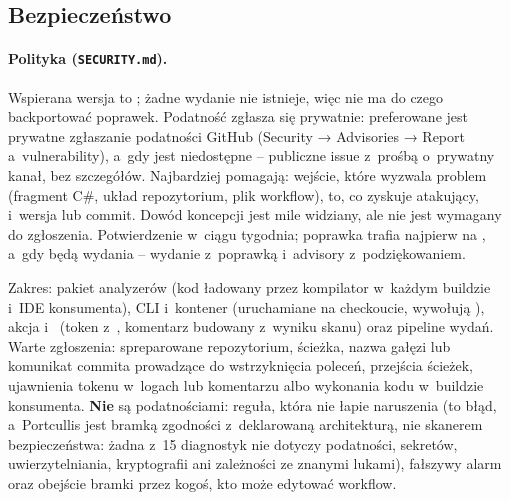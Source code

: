 
\subsection{Bezpieczeństwo}\label{sec:portcullis-bezpieczenstwo}

\paragraph{Polityka (\texttt{SECURITY.md}).} Wspierana wersja to ; żadne
wydanie nie istnieje, więc nie ma do czego backportować poprawek. Podatność zgłasza się
prywatnie: preferowane jest prywatne zgłaszanie podatności GitHub (Security → Advisories →
Report a~vulnerability), a~gdy jest niedostępne -- publiczne issue z~prośbą o~prywatny kanał,
bez szczegółów. Najbardziej pomagają: wejście, które wyzwala problem (fragment C\#, układ
repozytorium, plik workflow), to, co zyskuje atakujący, i~wersja lub commit. Dowód koncepcji
jest mile widziany, ale nie jest wymagany do zgłoszenia. Potwierdzenie
w~ciągu tygodnia; poprawka trafia najpierw na , a~gdy będą wydania -- wydanie
z~poprawką i~advisory z~podziękowaniem.

Zakres: pakiet analyzerów (kod ładowany przez kompilator w~każdym buildzie i~IDE
konsumenta), CLI i~kontener (uruchamiane na checkoucie, wywołują ), akcja
i~ (token z~, komentarz budowany
z~wyniku skanu) oraz pipeline wydań. Warte zgłoszenia: spreparowane repozytorium, ścieżka,
nazwa gałęzi lub komunikat commita prowadzące do wstrzyknięcia poleceń, przejścia ścieżek,
ujawnienia tokenu w~logach lub komentarzu albo wykonania kodu w~buildzie konsumenta.
\textbf{Nie} są podatnościami: reguła, która nie łapie naruszenia (to błąd, a~Portcullis jest
bramką zgodności z~deklarowaną architekturą, nie skanerem bezpieczeństwa: żadna z~15
diagnostyk nie dotyczy podatności, sekretów, uwierzytelniania, kryptografii ani zależności
ze znanymi lukami), fałszywy alarm oraz obejście bramki przez
kogoś, kto może edytować workflow.

